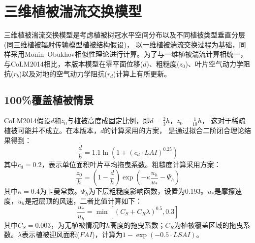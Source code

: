 \section{三维植被湍流交换模型}
三维植被湍流交换模型是考虑植被树冠水平空间分布以及不同植被类型垂直分层(同三维植被辐射传输模型植被结构假设)，
以一维植被湍流交换过程为基础，同样采用Monin–Obukhov相似性理论进行计算。为了与一维植被湍流计算相统一，
与CoLM2014相比，本版本模型在零平面位移($d$)、粗糙度($z_0$)、叶片空气动力学阻抗($r_b$)以及对地的空气动力学阻抗($r_d$)计算上有所更新。
\subsection{100\%覆盖植被情景}
CoLM2014假设$d$和$z_0$与植被高度成固定比例，即$d=\frac{2}{3}h$，$z_0=\frac{1}{10}h$，
这对于稀疏植被可能并不成立\citep{zeng2007consistent}。在本版本，$d$的计算采用\citet{choudhury1988}的方案，
是通过拟合\citet{shaw1982aerodynamic}二阶闭合理论结果得到：
\begin{equation}\label{dOh}
\frac{d}{h}=1.1 \ln \left(1+\left(c_{d} \cdot LAI \right)^{0.25}\right)
\end{equation}
其中$c_d=0.2$，表示单位面积叶片平均拖曳系数。粗糙度计算采用\citet{raupach1992drag,raupach1994simplified}方案：
\begin{equation}\label{zOh}
\frac{z_{0}}{h}=\left(1-\frac{d}{h}\right) \exp \left(-\kappa \frac{u_{h}}{u_{*}}-\Psi_{h}\right)
\end{equation}
其中$\kappa=0.4$为卡曼常数。$\Psi_h$为下层粗糙度影响函数，设置为0.193。$u_\ast$是摩擦速度，$u_h$是冠层顶的风速，二者比值计算如下：
\begin{equation}\label{ustrarOuh}
\frac{u_{*}}{u_{h}}=\min \left[\left(C_{S}+C_{R} \lambda\right)^{0.5}, 0.3\right]
\end{equation}
其中$C_S=0.003$，为无植被情况时$h$高度的拖曳系数；$C_R$为植被覆盖区域的拖曳系数。$\lambda$表示植被迎风面积($FAI$)，计算为$1-\exp{\left(-0.5 \cdot LSAI\right)}$。



